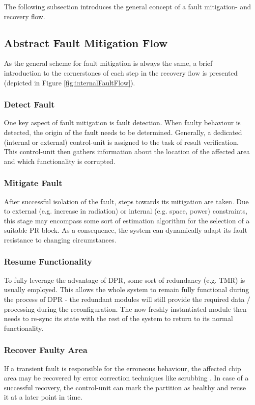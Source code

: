 The following subsection introduces the general concept of a fault mitigation- and recovery flow. 

\subsection{Abstract Fault Mitigation Flow}\label{AbstractFaultMitigationFlow}
As the general scheme for fault mitigation is always the same, a brief introduction to the cornerstones of each step in the recovery flow is presented (depicted in Figure \ref{fig:internalFaultFlow}). 

\subsubsection{Detect Fault}
    One key aspect of fault mitigation is fault detection. 
    When faulty behaviour is detected, the origin of the fault needs to be determined.
    Generally, a dedicated (internal or external) control-unit is assigned to the task of result verification.
    This control-unit then gathers information about the location of the affected area and which functionality is corrupted.
\subsubsection{Mitigate Fault}
    After successful isolation of the fault, steps towards its mitigation are taken.
    Due to external (e.g. increase in radiation) or internal (e.g. space, power) constraints, this stage may encompass some sort of estimation algorithm for the selection of a suitable \gls{PR} block.
    As a consequence, the system can dynamically adapt its fault resistance to changing circumstances.
\subsubsection{Resume Functionality}
    To fully leverage the advantage of \gls{DPR}, some sort of redundancy (e.g. \gls{TMR}) is usually employed.
    This allows the whole system to remain fully functional during the process of \gls{DPR} - the redundant modules will still provide the required data / processing during the reconfiguration. 
    The now freshly instantiated module then needs to re-sync its state with the rest of the system to return to its normal functionality.
\subsubsection{Recover Faulty Area}
    If a transient fault is responsible for the erroneous behaviour, the affected chip area may be recovered by error correction techniques like scrubbing \cite{reorda_error-detection_2017}. 
    In case of a successful recovery, the control-unit can mark the partition as healthy and reuse it at a later point in time.
    

